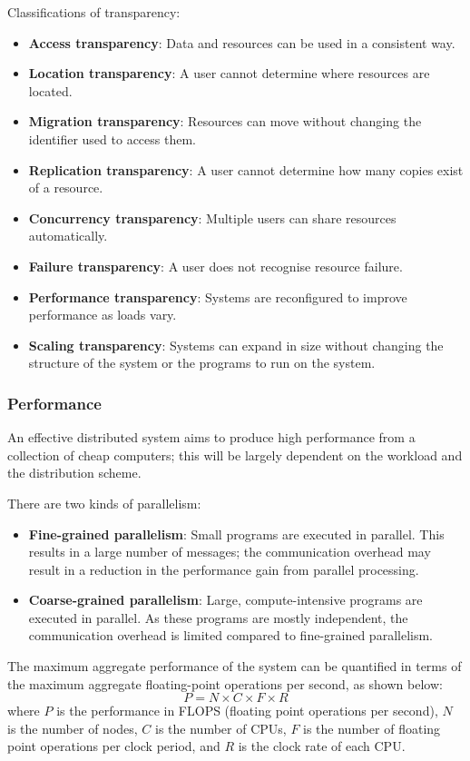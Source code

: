 Classifications of transparency:

\begin{itemize}
\item \textbf{Access transparency}: Data and resources can be used in a consistent way.
\item \textbf{Location transparency}: A user cannot determine where resources are located.
\item \textbf{Migration transparency}: Resources can move without changing the identifier used to access them.
\item \textbf{Replication transparency}: A user cannot determine how many copies exist of a resource.
\item \textbf{Concurrency transparency}: Multiple users can share resources automatically.
\item \textbf{Failure transparency}: A user does not recognise resource failure.
\item \textbf{Performance transparency}: Systems are reconfigured to improve performance as loads vary.
\item \textbf{Scaling transparency}: Systems can expand in size without changing the structure of the system or the programs to run on the system.
\end{itemize}

\subsubsection{Performance}
An effective distributed system aims to produce high performance from a collection of cheap computers; this will be largely dependent on the workload and the distribution scheme.

There are two kinds of parallelism:

\begin{itemize}
\item \textbf{Fine-grained parallelism}: Small programs are executed in parallel. This results in a large number of messages; the communication overhead may result in a reduction in the performance gain from parallel processing.
\item \textbf{Coarse-grained parallelism}: Large, compute-intensive programs are executed in parallel. As these programs are mostly independent, the communication overhead is limited compared to fine-grained parallelism.
\end{itemize}

The maximum aggregate performance of the system can be quantified in terms of the maximum aggregate floating-point operations per second, as shown below:
\[ P = N \times C \times F \times R \]
where $P$ is the performance in FLOPS (floating point operations per second), $N$ is the number of nodes, $C$ is the number of CPUs, $F$ is the number of floating point operations per clock period, and $R$ is the clock rate of each CPU.


